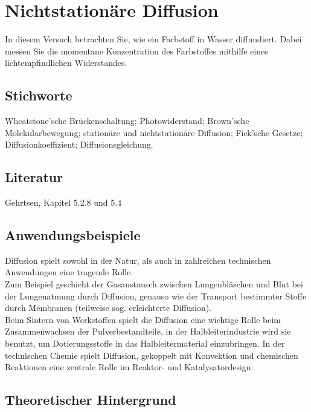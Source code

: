 \chapter{Nichtstationäre Diffusion}
\label{v:14}

In diesem Versuch betrachten Sie, wie ein Farbstoff in Wasser diffundiert. Dabei messen Sie die momentane Konzentration des Farbstoffes mithilfe eines lichtempfindlichen Widerstandes.

\section{Stichworte}

Wheatstone'sche Brückenschaltung; Photowiderstand; Brown'sche Molekularbewegung; stationäre und nichtstationäre Diffusion; Fick'sche Gesetze; Diffusionkoeffizient; Diffusionsgleichung.
%
\section{Literatur}

Gehrtsen, Kapitel 5.2.8 und 5.4
%
\section{Anwendungsbeispiele}

Diffusion spielt sowohl in der Natur, als auch in zahlreichen technischen Anwendungen eine tragende Rolle.\\
Zum Beispiel geschieht der Gasaustausch zwischen Lungenbläschen und Blut bei der Lungenatmung durch Diffusion, genauso wie der Transport bestimmter Stoffe durch Membranen (teilweise sog. erleichterte Diffusion). \\
Beim Sintern von Werkstoffen spielt die Diffusion eine wichtige Rolle beim Zusammenwachsen der Pulverbestandteile, in der Halbleiterindustrie wird sie benutzt, um Dotierungsstoffe in das Halbleitermaterial einzubringen. In der technischen Chemie spielt Diffusion, gekoppelt mit Konvektion und chemischen Reaktionen eine zentrale Rolle im Reaktor- und Katalysatordesign.

\section{Theoretischer Hintergrund}

